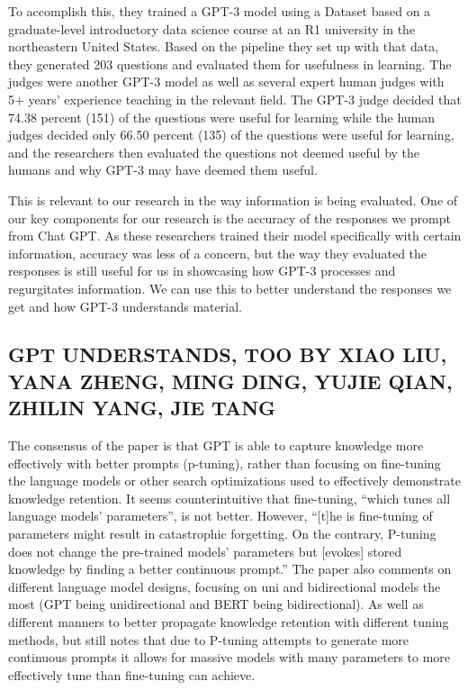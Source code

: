 \documentclass[letterpaper, 10pt, conference]{ieeeconf}
\begin{document}
	To accomplish this, they trained a GPT-3 model using a Dataset based on a graduate-level introductory data science course at an R1 university in the northeastern United States. Based on the pipeline they set up with that data, they generated 203 questions and evaluated them for usefulness in learning. The judges were another GPT-3 model as well as several expert human judges with 5+ years’ experience teaching in the relevant field. The GPT-3 judge decided that 74.38 percent (151) of the questions were useful for learning while the human judges decided only 66.50 percent (135) of the questions were useful for learning, and the researchers then evaluated the questions not deemed useful by the humans and why GPT-3 may have deemed them useful.

	This is relevant to our research in the way information is being evaluated. One of our key components for our research is the accuracy of the responses we prompt from Chat GPT. As these researchers trained their model specifically with certain information, accuracy was less of a concern, but the way they evaluated the responses is still useful for us in showcasing how GPT-3 processes and regurgitates information. We can use this to better understand the responses we get and how GPT-3 understands material.

        \subsection{GPT UNDERSTANDS, TOO BY XIAO LIU, YANA ZHENG, MING DING, YUJIE QIAN, ZHILIN YANG, JIE TANG}

        The consensus of the paper is that GPT is able to capture knowledge more effectively with better prompts (p-tuning), rather than focusing on fine-tuning the language models or other search optimizations used to effectively demonstrate knowledge retention. It seems counterintuitive that fine-tuning, “which tunes all language models’ parameters”, is not better. However, “[t]he is fine-tuning of parameters might result in catastrophic forgetting. On the contrary, P-tuning does not change the pre-trained models’ parameters but [evokes] stored knowledge by finding a better continuous prompt.” The paper also comments on different language model designs, focusing on uni and bidirectional models the most (GPT being unidirectional and BERT being bidirectional). As well as different manners to better propagate knowledge retention with different tuning methods, but still notes that due to P-tuning attempts to generate more continuous prompts it allows for massive models with many parameters to more effectively tune than fine-tuning can achieve.
\end{document}

